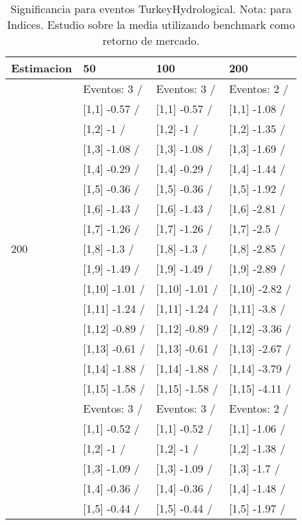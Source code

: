 \begin{table}

\caption{Significancia para eventos TurkeyHydrological. Nota: para Indices. Estudio sobre la media utilizando benchmark como retorno de mercado.}
\centering
\begin{tabular}[t]{llll}
\toprule
Estimacion & 50 & 100 & 200\\
\midrule
 & Eventos:  3 / & Eventos:  3 / & Eventos:  2 /\\
 & {}[1,1] -0.57  / & {}[1,1] -0.57  / & {}[1,1] -1.08  /\\
 & {}[1,2] -1  / & {}[1,2] -1  / & {}[1,2] -1.35  /\\
 & {}[1,3] -1.08  / & {}[1,3] -1.08  / & {}[1,3] -1.69  /\\
 & {}[1,4] -0.29  / & {}[1,4] -0.29  / & {}[1,4] -1.44  /\\
\addlinespace
 & {}[1,5] -0.36  / & {}[1,5] -0.36  / & {}[1,5] -1.92  /\\
 & {}[1,6] -1.43  / & {}[1,6] -1.43  / & {}[1,6] -2.81  /\\
 & {}[1,7] -1.26  / & {}[1,7] -1.26  / & {}[1,7] -2.5  /\\
200 & {}[1,8] -1.3  / & {}[1,8] -1.3  / & {}[1,8] -2.85  /\\
 & {}[1,9] -1.49  / & {}[1,9] -1.49  / & {}[1,9] -2.89  /\\
\addlinespace
 & {}[1,10] -1.01  / & {}[1,10] -1.01  / & {}[1,10] -2.82  /\\
 & {}[1,11] -1.24  / & {}[1,11] -1.24  / & {}[1,11] -3.8  /\\
 & {}[1,12] -0.89  / & {}[1,12] -0.89  / & {}[1,12] -3.36  /\\
 & {}[1,13] -0.61  / & {}[1,13] -0.61  / & {}[1,13] -2.67  /\\
 & {}[1,14] -1.88  / & {}[1,14] -1.88  / & {}[1,14] -3.79  /\\
\addlinespace
 & {}[1,15] -1.58  / & {}[1,15] -1.58  / & {}[1,15] -4.11  /\\
 & Eventos:  3 / & Eventos:  3 / & Eventos:  2 /\\
 & {}[1,1] -0.52  / & {}[1,1] -0.52  / & {}[1,1] -1.06  /\\
 & {}[1,2] -1  / & {}[1,2] -1  / & {}[1,2] -1.38  /\\
 & {}[1,3] -1.09  / & {}[1,3] -1.09  / & {}[1,3] -1.7  /\\
\addlinespace
 & {}[1,4] -0.36  / & {}[1,4] -0.36  / & {}[1,4] -1.48  /\\
 & {}[1,5] -0.44  / & {}[1,5] -0.44  / & {}[1,5] -1.97  /\\

\end{tabular}
\end{table}
